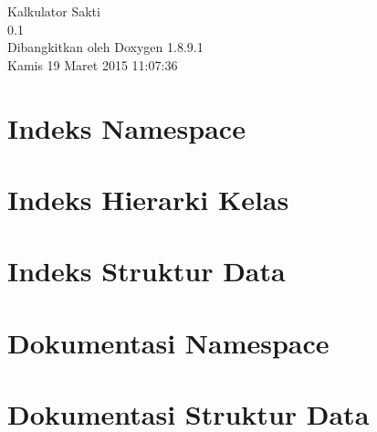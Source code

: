 \documentclass[twoside]{book}
\newcommand{\+}{\discretionary{\mbox{\scriptsize$\hookleftarrow$}}{}{}}
\newcommand{\clearemptydoublepage}{%
  \newpage{\pagestyle{empty}\cleardoublepage}%
}
\begin{document}
\hypersetup{pageanchor=false,
             bookmarks=true,
             bookmarksnumbered=true,
             pdfencoding=unicode
            }
\begin{titlepage}
\vspace*{7cm}
\begin{center}%
{\Large Kalkulator Sakti \\[1ex]\large 0.\+1 }\\
\vspace*{1cm}
{\large Dibangkitkan oleh Doxygen 1.8.9.1}\\
\vspace*{0.5cm}
{\small Kamis 19 Maret 2015 11:07:36}\\
\end{center}
\end{titlepage}
\clearemptydoublepage
\tableofcontents
\clearemptydoublepage
{}
\hypersetup{pageanchor=true}

\chapter{Indeks Namespace}

\chapter{Indeks Hierarki Kelas}

\chapter{Indeks Struktur Data}

\chapter{Dokumentasi Namespace}





\chapter{Dokumentasi Struktur Data}



















\backmatter
\newpage
{}
\clearemptydoublepage
{}
\printindex
\end{document}
